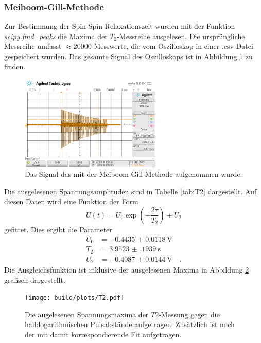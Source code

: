 \subsubsection{Meiboom-Gill-Methode}

\noindent
Zur Bestimmung der Spin-Spin Relaxationszeit wurden mit der Funktion \textit{scipy.find\_peaks} die Maxima der $T_2$-Messreihe ausgelesen. 
Die ursprüngliche Messreihe umfasst $\approx 20000$ Messwerte, die vom Oszilloskop in einer .csv Datei gespeichert wurden. 
Das gesamte Signal des Oszilloskops ist in Abbildung \ref{img:Sig1} zu finden.
\begin{figure}[H]
  \centering
  \includegraphics[width=0.6\textwidth]{python/data/scope_2.png}
  \caption{Das Signal das mit der Meiboom-Gill-Methode aufgenommen wurde.}
\label{img:Sig1}
\end{figure}


\noindent
Die ausgelesenen Spannungsamplituden sind in Tabelle \ref{tab:T2} dargestellt. 
Auf diesen Daten wird eine Funktion der Form
\begin{equation*}
  U\left(t\right) = U_0 \exp{\left(-\frac{2\tau}{T_2}\right)} + U_2
\end{equation*}
gefittet. Dies ergibt die Parameter
\begin{align*}
  U_0 &= \SI{-0.4435(118)}{\volt}\\
  T_2 &= \SI{3.9523(1939)}{\second}\\
  U_2 &= \SI{-0.4087(144)}{\volt} \quad .
\end{align*}
Die Ausgleichsfunktion ist inklusive der ausgelesenen Maxima in Abbildung \ref{img:T2} grafisch dargestellt.


\begin{figure}[H]
  \centering
  \texttt{[image: build/plots/T2.pdf]}
  \caption{Die augelesenen Spannungsmaxima der $T2$-Messung gegen die halblogarithmischen Pulsabstände aufgetragen. 
  Zusätzlich ist noch der mit damit korrespondierende Fit aufgetragen.}
\label{img:T2}
\end{figure}


